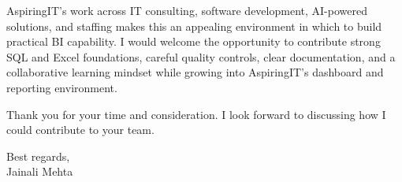 \documentclass[letterpaper,11pt]{article}
\begin{document}
\bigbreak
AspiringIT's work across IT consulting, software development, AI-powered solutions, and staffing makes this an appealing environment in which to build practical BI capability. I would welcome the opportunity to contribute strong SQL and Excel foundations, careful quality controls, clear documentation, and a collaborative learning mindset while growing into AspiringIT's dashboard and reporting environment.

\bigbreak
Thank you for your time and consideration. I look forward to discussing how I could contribute to your team.

\bigbreak
Best regards,\\
Jainali Mehta
\end{document}
